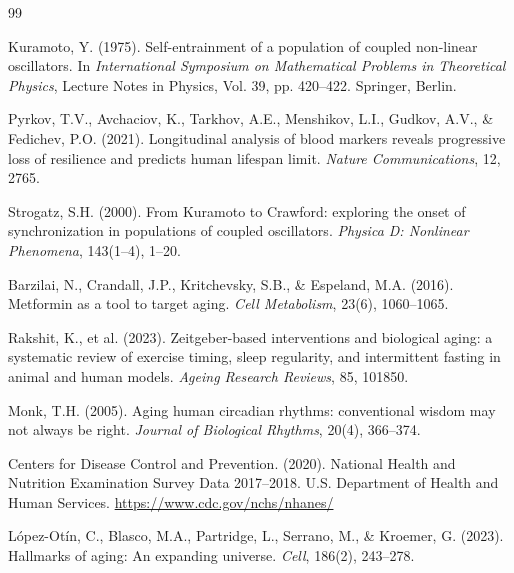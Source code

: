 \documentclass[12pt]{article}
\begin{document}
\begin{thebibliography}{99}

Kuramoto, Y. (1975).
Self-entrainment of a population of coupled non-linear oscillators.
In \textit{International Symposium on Mathematical Problems in Theoretical Physics},
Lecture Notes in Physics, Vol. 39, pp. 420--422. Springer, Berlin.

Pyrkov, T.V., Avchaciov, K., Tarkhov, A.E., Menshikov, L.I., Gudkov, A.V., \&
Fedichev, P.O. (2021).
Longitudinal analysis of blood markers reveals progressive loss of resilience and
predicts human lifespan limit.
\textit{Nature Communications}, 12, 2765.

Strogatz, S.H. (2000).
From Kuramoto to Crawford: exploring the onset of synchronization in populations
of coupled oscillators.
\textit{Physica D: Nonlinear Phenomena}, 143(1--4), 1--20.

Barzilai, N., Crandall, J.P., Kritchevsky, S.B., \& Espeland, M.A. (2016).
Metformin as a tool to target aging.
\textit{Cell Metabolism}, 23(6), 1060--1065.

Rakshit, K., et al. (2023).
Zeitgeber-based interventions and biological aging: a systematic review of
exercise timing, sleep regularity, and intermittent fasting in animal and
human models.
\textit{Ageing Research Reviews}, 85, 101850.

Monk, T.H. (2005).
Aging human circadian rhythms: conventional wisdom may not always be right.
\textit{Journal of Biological Rhythms}, 20(4), 366--374.

Centers for Disease Control and Prevention. (2020).
National Health and Nutrition Examination Survey Data 2017--2018.
U.S. Department of Health and Human Services.
\url{https://www.cdc.gov/nchs/nhanes/}

L\'{o}pez-Ot\'{i}n, C., Blasco, M.A., Partridge, L., Serrano, M., \&
Kroemer, G. (2023).
Hallmarks of aging: An expanding universe.
\textit{Cell}, 186(2), 243--278.

\end{thebibliography}
\end{document}
